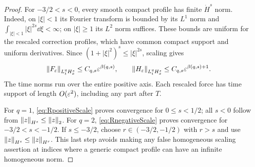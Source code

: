 \begin{proof}
For $-3/2<s<0$, every smooth compact profile has finite $\dot H^s$ norm. Indeed, on $|\xi|<1$ its Fourier transform is bounded by its $L^1$ norm and $\int_{|\xi|<1}|\xi|^{2s}\dd\xi<\infty$; on $|\xi|\ge1$ its $L^2$ norm suffices. These bounds are uniform for the rescaled correction profiles, which have common compact support and uniform derivatives. Since
$(1+|\xi|^2)^s\le|\xi|^{2s}$, scaling gives
\begin{equation}\label{eq:RnegativeScale}
 \left\lVert F_\varepsilon\right\rVert_{L^q_tH^s_x}\le C_{q,s}\varepsilon^{\beta(q,s)},\qquad
 \left\lVert H_\varepsilon\right\rVert_{L^q_tH^s_x}\le C_{q,s}\varepsilon^{\beta(q,s)+1}.
\end{equation}
The time norms run over the entire positive axis. Each rescaled force has time support of length $O(\varepsilon^2)$, including any part after $T$.

For $q=1$, \eqref{eq:RpositiveScale} proves convergence for $0\le s<1/2$; all $s<0$ follow from $\left\lVert z\right\rVert_{H^s}\le\left\lVert z\right\rVert_2$. For $q=2$, \eqref{eq:RnegativeScale} proves convergence for $-3/2<s<-1/2$. If $s\le-3/2$, choose $r\in(-3/2,-1/2)$ with $r>s$ and use $\left\lVert z\right\rVert_{H^s}\le\left\lVert z\right\rVert_{H^r}$. This last step avoids making any false homogeneous scaling assertion at indices where a generic compact profile can have an infinite homogeneous norm.
\end{proof}

